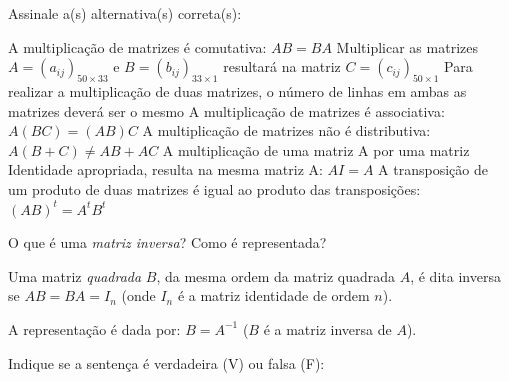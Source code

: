\documentclass[pdftex, brazil, 12pt, oneside, addpoints, answers]{exam}
\newcommand{\vf}[1][{}]{%
  \fillin[#1][0.25in]%
}
\begin{document}
\begin{questions}
\question
Assinale a(s) alternativa(s) correta(s):
\begin{checkboxes}
  \choice A multiplicação de matrizes é comutativa: $AB = BA$
  \CorrectChoice Multiplicar as matrizes $A = (a_{ij})_{50 \times 33}$ e $B = (b_{ij})_{33 \times 1}$
  resultará na matriz $C = (c_{ij})_{50 \times 1}$
  \choice Para realizar a multiplicação de duas matrizes, o número de linhas
  em ambas as matrizes deverá ser o mesmo
  \CorrectChoice A multiplicação de matrizes é associativa: $A(BC) = (AB)C$
  \choice A multiplicação de matrizes não é distributiva: $A(B + C) \ne AB + AC$
  \CorrectChoice A multiplicação de uma matriz A por uma matriz Identidade apropriada,
  resulta na mesma matriz A: $AI = A$
  \CorrectChoice A transposição de um produto de duas matrizes é igual ao produto
  das transposições: $(AB)^t = A^tB^t$
\end{checkboxes}


\ifprintanswers
\newpage
\fi
{}

\question
O que é uma \emph{matriz inversa}? Como é representada?
\begin{solutionorlines}[0.50in]
  Uma matriz \emph{quadrada} $B$, da mesma ordem da matriz quadrada $A$, é dita inversa
  se $AB = BA = I_n$ (onde $I_n$ é a matriz identidade de ordem $n$).

  A representação é dada por: $B = A^{-1}$ ($B$ é a matriz inversa de $A$).
\end{solutionorlines}

\question
Indique se a sentença é verdadeira (V) ou falsa (F):
\end{questions}
\end{document}
